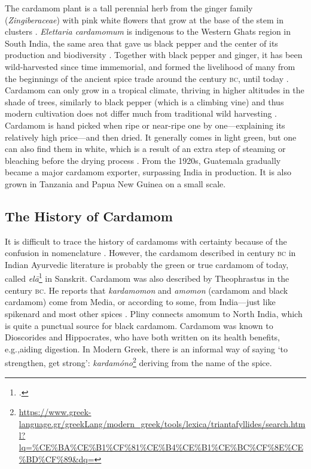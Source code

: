 The cardamom plant is a tall perennial herb from the ginger family (\textit{Zingiberaceae}) with pink white flowers that grow at the base of the stem in clusters \autocite[132]{van_wyk_culinary_2014}. \textit{Elettaria cardamomum} is indigenous to the Western Ghats region in South India, the same area that gave us black pepper and the center of its production and biodiversity \autocite[1]{ravindran_cardamom_2002}. Together with black pepper and ginger, it has been wild-harvested since time immemorial, and formed the livelihood of many from the beginnings of the ancient spice trade around the  century \textsc{bc}, until today \autocite[132]{van_wyk_culinary_2014}. Cardamom can only grow in a tropical climate, thriving in higher altitudes in the shade of trees, similarly to black pepper (which is a climbing vine) and thus modern cultivation does not differ much from traditional wild harvesting \autocite[132]{van_wyk_culinary_2014}. Cardamom is hand picked when ripe or near-ripe one by one---explaining its relatively high price---and then dried. It generally comes in light green, but one can also find them in white, which is a result of an extra step of steaming or bleaching before the drying process \autocite[132]{van_wyk_culinary_2014}. From the 1920s, Guatemala gradually became a major cardamom exporter, surpassing India in production. It is also grown in Tanzania and Papua New Guinea on a small scale.

\subsection{The History of Cardamom}

It is difficult to trace the history of cardamoms with certainty because of the confusion in nomenclature \autocite{cumo_encyclopedia_2013}. However, the cardamom described in  century \textsc{bc} in Indian Ayurvedic literature is probably the green or true cardamom of today, called \textit{el\={a}}\footcite[232]{monier-williams_sanskrit-english_1899} in Sanskrit. Cardamom was also described by Theophrastus in the  century \textsc{bc}. He reports that \textit{kardamomon} and \textit{amomon} (cardamom and black cardamom) come from Media, or according to some, from India---just like spikenard and most other spices \autocite[249]{theophrastus_enquiry_1916}. Pliny connects amomum to North India, which is quite a punctual source for black cardamom. Cardamom was known to Dioscorides and Hippocrates, who have both written on its health benefits, e.g.,aiding digestion. In Modern Greek, there is an informal way of saying `to strengthen, get strong':  \textit{kardamóno}\footnote{\url{https://www.greek-language.gr/greekLang/modern_greek/tools/lexica/triantafyllides/search.html?lq=\%CE\%BA\%CE\%B1\%CF\%81\%CE\%B4\%CE\%B1\%CE\%BC\%CF\%8E\%CE\%BD\%CF\%89\&dq=}} deriving from the name of the spice.

